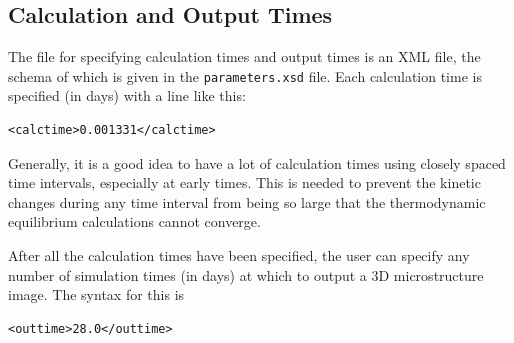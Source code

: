 \documentclass{article}
\begin{document}
\normalsize{}
\subsection{Calculation and Output Times}
The file for specifying calculation times and output times
is an XML file, the schema of which is given in the \verb!parameters.xsd! file.
Each calculation time is specified (in days) with a line like this:

\small{
\begin{lstlisting}
<calctime>0.001331</calctime>
\end{lstlisting}
}

\normalsize{ }
Generally, it is a good idea to have a lot of calculation times using closely
spaced time intervals, especially at early times.  This is needed to prevent the
kinetic changes during any time interval from being so large that the thermodynamic
equilibrium calculations cannot converge.

After all the calculation times have been specified, the user can specify any
number of simulation times (in days) at which to output a 3D microstructure image.
The syntax for this is

\small{
\begin{lstlisting}
<outtime>28.0</outtime>
\end{lstlisting}
}
\end{document}

